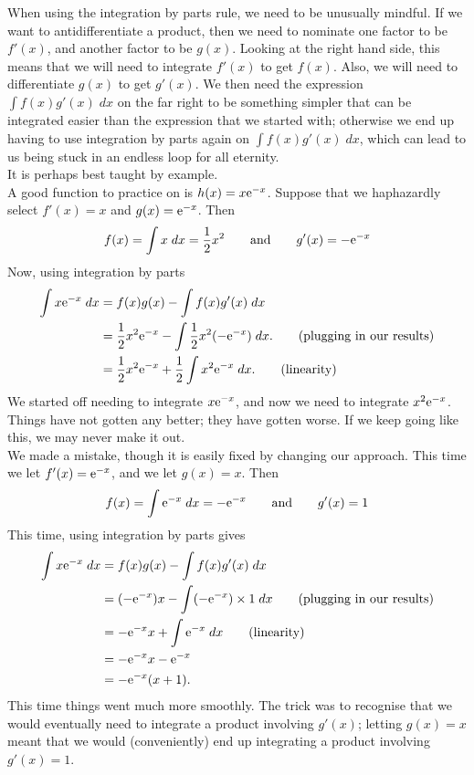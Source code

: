 \noindent When using the integration by parts rule, we need to be unusually mindful. If we want to antidifferentiate a product, then we need to nominate one factor to be $f'(x)$, and another factor to be $g(x)$. Looking at the right hand side, this means that we will need to integrate $f'(x)$ to get $f(x)$. Also, we will need to differentiate $g(x)$ to get $g'(x)$. We then need the expression $\int f(x)g'(x) \; dx$ on the far right to be something simpler that can be integrated easier than the expression that we started with; otherwise we end up having to use integration by parts again on $\int f(x)g'(x) \; dx$, which can lead to us being stuck in an endless loop for all eternity. \\

\noindent It is perhaps best taught by example. \\

\noindent A good function to practice on is $h(x) = x\mathrm{e}^{-x}$. Suppose that we haphazardly select $f'(x) = x$ and $g(x) = \mathrm{e}^{-x}$. Then
\[
f(x) = \int x \; dx = \frac{1}{2}x^2 \qquad \text{and} \qquad g'(x) = -\mathrm{e}^{-x}
\]
Now, using integration by parts
\begin{align*}
\int x\mathrm{e}^{-x} \; dx & = f(x)g(x) - \int f(x)g'(x) \; dx \\
		        & = \frac{1}{2}x^2\mathrm{e}^{-x} - \int \frac{1}{2}x^2 (-\mathrm{e}^{-x}) \; dx. \tag{plugging in our results} \\
		        & = \frac{1}{2}x^2\mathrm{e}^{-x} + \frac{1}{2} \int x^2 \mathrm{e}^{-x} \; dx. \tag{linearity}
\end{align*}
We started off needing to integrate $x\mathrm{e}^{-x}$, and now we need to integrate $x^2\mathrm{e}^{-x}$. Things have not gotten any better; they have gotten worse. If we keep going like this, we may never make it out. \\

\noindent We made a mistake, though it is easily fixed by changing our approach. This time we let $f'(x) = \mathrm{e}^{-x}$, and we let $g(x) = x$. Then
\[
f(x) = \int \mathrm{e}^{-x} \; dx = -\mathrm{e}^{-x} \qquad \text{and} \qquad g'(x) = 1
\]
This time, using integration by parts gives
\begin{align*}
\int x\mathrm{e}^{-x} \; dx & = f(x)g(x) - \int f(x)g'(x) \; dx \\
		& = (-\mathrm{e}^{-x})x - \int (-\mathrm{e}^{-x})\times1 \; dx \tag{plugging in our results} \\
		& = -\mathrm{e}^{-x}x + \int \mathrm{e}^{-x} \; dx \tag{linearity} \\
		& = -\mathrm{e}^{-x}x - \mathrm{e}^{-x} \\
		& = -\mathrm{e}^{-x}(x+1).
\end{align*}
This time things went much more smoothly. The trick was to recognise that we would eventually need to integrate a product involving $g'(x)$; letting $g(x) = x$ meant that we would (conveniently) end up integrating a product involving $g'(x) = 1$. 

